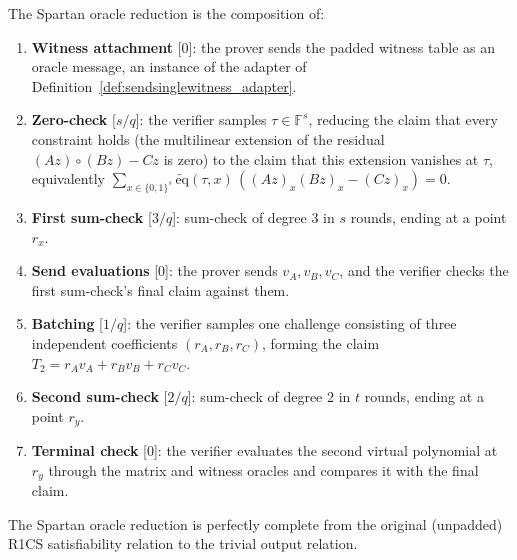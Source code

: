 \begin{definition}
    \label{def:spartan_reduction}
    \leanok
    The Spartan oracle reduction is the composition of:
    \begin{enumerate}
        \item \textbf{Witness attachment} [$0$]: the prover sends the padded witness table as an
        oracle message, an instance of the adapter of Definition~\ref{def:sendsinglewitness_adapter}.
        \item \textbf{Zero-check} [$s/q$]: the verifier samples $\tau \in \mathbb{F}^{s}$, reducing
        the claim that every constraint holds (the multilinear extension of the residual
        $(Az) \circ (Bz) - Cz$ is zero) to the claim that this extension vanishes at $\tau$,
        equivalently
        $\sum_{x \in \{0,1\}^s} \tilde{\text{eq}}(\tau, x)\,((Az)_x (Bz)_x - (Cz)_x) = 0$.
        \item \textbf{First sum-check} [$3/q$]: sum-check of degree $3$ in $s$ rounds, ending at a
        point $r_x$.
        \item \textbf{Send evaluations} [$0$]: the prover sends $v_A, v_B, v_C$, and the verifier
        checks the first sum-check's final claim against them.
        \item \textbf{Batching} [$1/q$]: the verifier samples one challenge consisting of three
        independent coefficients $(r_A, r_B, r_C)$, forming the claim
        $T_2 = r_A v_A + r_B v_B + r_C v_C$.
        \item \textbf{Second sum-check} [$2/q$]: sum-check of degree $2$ in $t$ rounds, ending at
        a point $r_y$.
        \item \textbf{Terminal check} [$0$]: the verifier evaluates the second virtual polynomial at
        $r_y$ through the matrix and witness oracles and compares it with the final claim.
    \end{enumerate}
\end{definition}

\begin{theorem}
    \label{thm:spartan_completeness}
    \leanok
    The Spartan oracle reduction is perfectly complete from the original (unpadded) R1CS
    satisfiability relation to the trivial output relation.
\end{theorem}


